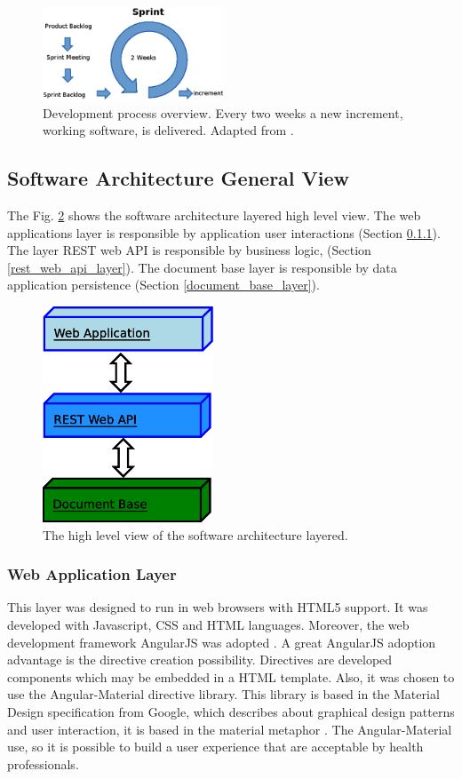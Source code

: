 \documentclass[journal]{IEEEtran}
\begin{document}
\begin{figure}[!t]
	\centering
	\includegraphics[width=0.48\textwidth]{./dev_proc.eps}
	\caption{Development process overview.
		Every two weeks a new increment, working software, is delivered.
		Adapted from \cite{Schwaber2004}.
	}
	\label{dev_proc}
\end{figure}

\subsection{Software Architecture General View}
The Fig. \ref{app_layers} shows the software architecture layered high level view.
The web applications layer is responsible by application user interactions (Section \ref{web_application_layer}).
The layer REST web API is responsible by business logic, (Section \ref{rest_web_api_layer}).
The document base layer is responsible by data application persistence (Section \ref{document_base_layer}).
\begin{figure}[!t]
	\centering
	\includegraphics[width=2in]{./app_layers.eps}
	\caption{The high level view of the software architecture layered.
	}
	\label{app_layers}
\end{figure}

\subsubsection{Web Application Layer}
\label{web_application_layer}

This layer was designed to run in web browsers with HTML5 support.
It was developed with Javascript, CSS and HTML languages. 
Moreover, the web development framework AngularJS was adopted \cite{Branas2014,Freeman2014}. 
A great AngularJS adoption advantage is the directive creation possibility. 
Directives are developed components which may be embedded in a HTML template.
Also, it was chosen to use the Angular-Material directive library. 
This library is based in the Material Design specification from Google, which
describes about graphical design patterns and user interaction, it is based in the material metaphor
\cite{Google2015a}. The Angular-Material use, so it is possible to build a user experience that are acceptable by health professionals.
\end{document}
